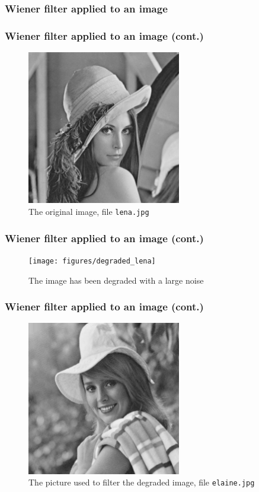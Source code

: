 \documentclass[10pt]{beamer}
\begin{document}
\begin{frame}
  \frametitle{Wiener filter applied to an image}
  
\end{frame}

\begin{frame}
  \frametitle{Wiener filter applied to an image (cont.)}
  \begin{figure}
    \centering
    \includegraphics[width=0.6\textwidth]{lena}
    \caption{The original image, file \texttt{lena.jpg}}
  \end{figure}
\end{frame}

\begin{frame}
  \frametitle{Wiener filter applied to an image (cont.)}
  \begin{figure}
    \centering
    \texttt{[image: figures/degraded\_lena]}
    \caption{The image has been degraded with a large noise}
  \end{figure}
\end{frame}

\begin{frame}
  \frametitle{Wiener filter applied to an image (cont.)}
  \begin{figure}
    \centering
    \includegraphics[width=0.6\textwidth]{elaine}
    \caption{The picture used to filter the degraded image, file
      \texttt{elaine.jpg}}
  \end{figure}
\end{frame}
\end{document}
